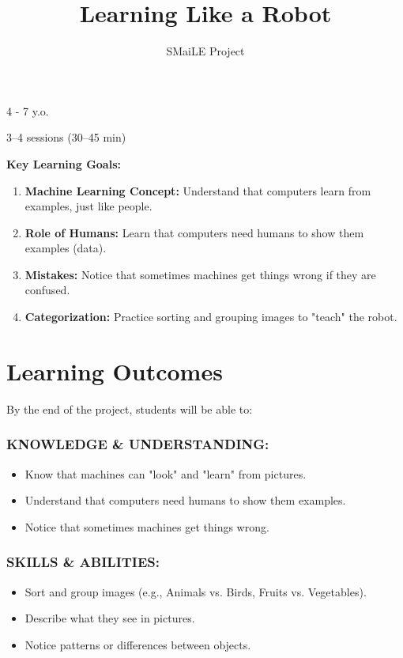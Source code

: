 \documentclass[11pt, a4paper]{article}
\begin{document}
\title{\textbf{\color{SmaileOrange}Learning Like a Robot}}
\author{SMaiLE Project}
\date{}
\maketitle
\thispagestyle{plain}

\begin{keyinfobox}
    \begin{description}[leftmargin=*, labelindent=0pt]
        \item[\bfseries\color{SmaileOrange} Target Group:] 4 - 7 y.o.
        \item[\bfseries\color{SmaileOrange} Duration:] 3--4 sessions (30--45 min)
    \end{description}
    \textbf{Key Learning Goals:}
    \begin{enumerate}
        \item \textbf{Machine Learning Concept:} Understand that computers learn from examples, just like people.
        \item \textbf{Role of Humans:} Learn that computers need humans to show them examples (data).
        \item \textbf{Mistakes:} Notice that sometimes machines get things wrong if they are confused.
        \item \textbf{Categorization:} Practice sorting and grouping images to "teach" the robot.
    \end{enumerate}
\end{keyinfobox}

\section*{Learning Outcomes}
By the end of the project, students will be able to:

\subsubsection*{KNOWLEDGE \& UNDERSTANDING:}
\begin{itemize}
    \item Know that machines can "look" and "learn" from pictures.
    \item Understand that computers need humans to show them examples.
    \item Notice that sometimes machines get things wrong.
\end{itemize}

\subsubsection*{SKILLS \& ABILITIES:}
\begin{itemize}
    \item Sort and group images (e.g., Animals vs. Birds, Fruits vs. Vegetables).
    \item Describe what they see in pictures.
    \item Notice patterns or differences between objects.
\end{itemize}
\end{document}
